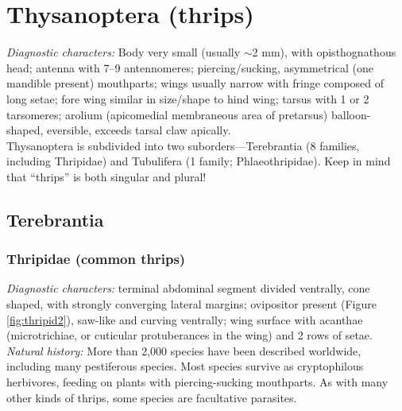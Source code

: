 \documentclass[letterpaper, 11pt]{article}
\begin{document}
\section{Thysanoptera (thrips)}
\noindent{}\textit{Diagnostic characters:} Body very small (usually $\sim$2 mm), with opisthognathous head; antenna with 7--9 antennomeres; piercing/sucking, asymmetrical (one mandible present) mouthparts; wings usually narrow with fringe composed of long setae; fore wing similar in size/shape to hind wing; tarsus with 1 or 2 tarsomeres; arolium (apicomedial membraneous area of pretarsus) balloon-shaped, eversible, exceeds tarsal claw apically.\\

\noindent{}Thysanoptera is subdivided into two suborders---Terebrantia (8 families, including Thripidae) and Tubulifera (1 family; Phlaeothripidae). Keep in mind that ``thrips'' is both singular and plural!

\subsection{Terebrantia}
\subsubsection{Thripidae (common thrips)}
\noindent{}\textit{Diagnostic characters:} terminal abdominal segment divided ventrally, cone shaped, with strongly converging lateral margins; ovipositor present (Figure \ref{fig:thripid2}), saw-like and curving ventrally; wing surface with acanthae (microtrichiae, or cuticular protuberances in the wing) and 2 rows of setae. \\

\noindent{}\textit{Natural history:} More than 2,000 species have been described worldwide, including many pestiferous species. Most species survive as cryptophilous herbivores, feeding on plants with piercing-sucking mouthparts. As with many other kinds of thrips, some species are facultative parasites.\\
\end{document}
